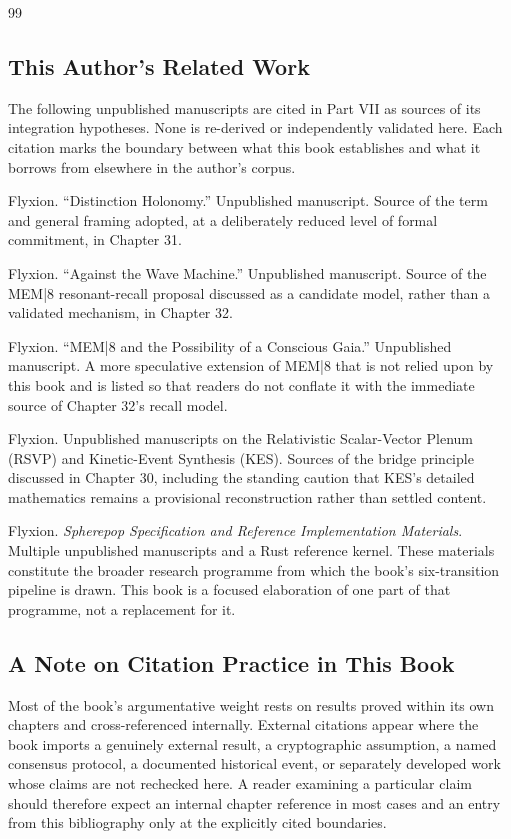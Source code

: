 \documentclass[11pt,openany]{book}
\begin{document}
\begin{thebibliography}{99}
\subsection*{This Author's Related Work}

The following unpublished manuscripts are cited in Part VII as sources of its
integration hypotheses. None is re-derived or independently validated here.
Each citation marks the boundary between what this book establishes and what
it borrows from elsewhere in the author's corpus.

Flyxion.
``Distinction Holonomy.'' Unpublished manuscript.
Source of the term and general framing adopted, at a deliberately reduced
level of formal commitment, in Chapter 31.

Flyxion.
``Against the Wave Machine.'' Unpublished manuscript.
Source of the MEM|8 resonant-recall proposal discussed as a candidate model,
rather than a validated mechanism, in Chapter 32.

Flyxion.
``MEM|8 and the Possibility of a Conscious Gaia.'' Unpublished manuscript.
A more speculative extension of MEM|8 that is not relied upon by this book and
is listed so that readers do not conflate it with the immediate source of
Chapter 32's recall model.

Flyxion.
Unpublished manuscripts on the Relativistic Scalar-Vector Plenum (RSVP) and
Kinetic-Event Synthesis (KES).
Sources of the bridge principle discussed in Chapter 30, including the
standing caution that KES's detailed mathematics remains a provisional
reconstruction rather than settled content.

Flyxion.
\emph{Spherepop Specification and Reference Implementation Materials}.
Multiple unpublished manuscripts and a Rust reference kernel.
These materials constitute the broader research programme from which the
book's six-transition pipeline is drawn. This book is a focused elaboration of
one part of that programme, not a replacement for it.

\subsection*{A Note on Citation Practice in This Book}

Most of the book's argumentative weight rests on results proved within its own
chapters and cross-referenced internally. External citations appear where the
book imports a genuinely external result, a cryptographic assumption, a named
consensus protocol, a documented historical event, or separately developed
work whose claims are not rechecked here. A reader examining a particular
claim should therefore expect an internal chapter reference in most cases and
an entry from this bibliography only at the explicitly cited boundaries.

\end{thebibliography}
\end{document}
